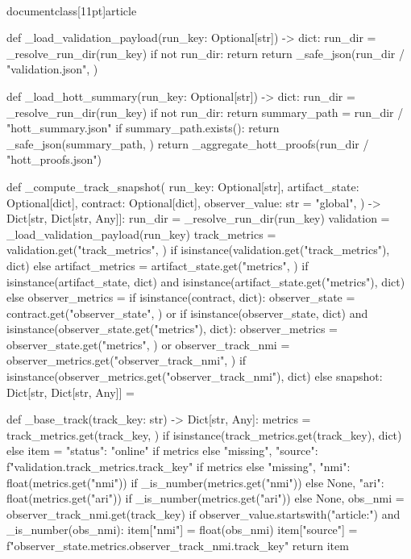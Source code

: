 \\documentclass[11pt]{article}
\begin{document}
\begin{CodeBlock}
{def _load_validation_payload(run_key: Optional[str]) -> dict:
    run_dir = _resolve_run_dir(run_key)
    if not run_dir:
        return {}
    return _safe_json(run_dir / "validation.json", {})


def _load_hott_summary(run_key: Optional[str]) -> dict:
    run_dir = _resolve_run_dir(run_key)
    if not run_dir:
        return {}
    summary_path = run_dir / "hott_summary.json"
    if summary_path.exists():
        return _safe_json(summary_path, {})
    return _aggregate_hott_proofs(run_dir / "hott_proofs.json")


def _compute_track_snapshot(
    run_key: Optional[str],
    artifact_state: Optional[dict],
    contract: Optional[dict],
    observer_value: str = "global",
) -> Dict[str, Dict[str, Any]]:
    run_dir = _resolve_run_dir(run_key)
    validation = _load_validation_payload(run_key)
    track_metrics = validation.get("track_metrics", {}) if isinstance(validation.get("track_metrics"), dict) else {}
    artifact_metrics = artifact_state.get("metrics", {}) if isinstance(artifact_state, dict) and isinstance(artifact_state.get("metrics"), dict) else {}
    observer_metrics = {}
    if isinstance(contract, dict):
        observer_state = contract.get("observer_state", {}) or {}
        if isinstance(observer_state, dict) and isinstance(observer_state.get("metrics"), dict):
            observer_metrics = observer_state.get("metrics", {}) or {}
    observer_track_nmi = observer_metrics.get("observer_track_nmi", {}) if isinstance(observer_metrics.get("observer_track_nmi"), dict) else {}
    snapshot: Dict[str, Dict[str, Any]] = {}

    def _base_track(track_key: str) -> Dict[str, Any]:
        metrics = track_metrics.get(track_key, {}) if isinstance(track_metrics.get(track_key), dict) else {}
        item = {
            "status": "online" if metrics else "missing",
            "source": f"validation.track_metrics.{track_key}" if metrics else "missing",
            "nmi": float(metrics.get("nmi")) if _is_number(metrics.get("nmi")) else None,
            "ari": float(metrics.get("ari")) if _is_number(metrics.get("ari")) else None,
        }
        obs_nmi = observer_track_nmi.get(track_key)
        if observer_value.startswith("article:") and _is_number(obs_nmi):
            item["nmi"] = float(obs_nmi)
            item["source"] = f"observer_state.metrics.observer_track_nmi.{track_key}"
        return item

}
\end{CodeBlock}
\end{document}
